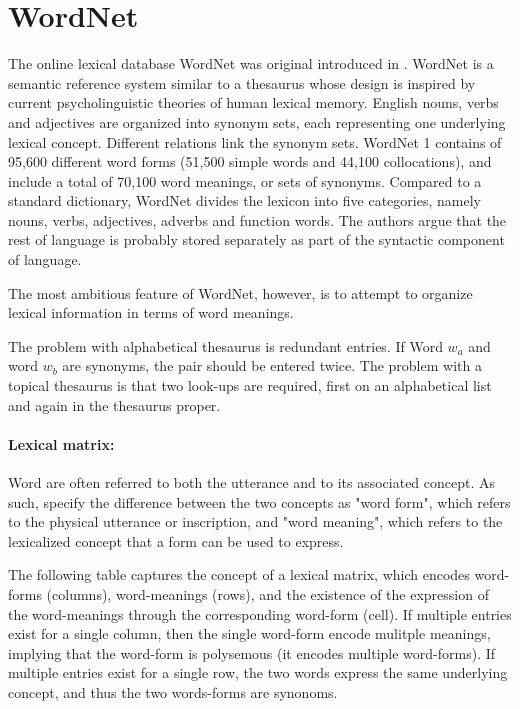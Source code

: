\documentclass[a4paper,12pt,twoside,openright]{report}
\begin{document}
\section{WordNet}

The online lexical database WordNet was original introduced in \cite{miller90}.
WordNet is a semantic reference system similar to a thesaurus whose design is inspired by current psycholinguistic theories of human lexical memory.
English nouns, verbs and adjectives are organized into synonym sets, each representing one underlying lexical concept.
Different relations link the synonym sets.
WordNet 1 contains of 95,600 different word forms (51,500 simple words and 44,100 collocations), and include a total of 70,100 word meanings, or sets of synonyms.
Compared to a standard dictionary, WordNet divides the lexicon into five categories, namely nouns, verbs, adjectives, adverbs and function words. 
The authors argue that the rest of language is probably stored separately as part of the syntactic component of language.

The most ambitious feature of WordNet, however, is to attempt to organize lexical information in terms of word meanings.

The problem with alphabetical thesaurus is redundant entries. If Word $w_a$ and word $w_b$ are synonyms, the pair should be entered twice.
The problem with a topical thesaurus is that two look-ups are required, first on an alphabetical list and again in the thesaurus proper.

\paragraph{Lexical matrix:} 
Word are often referred to both the utterance and to its associated concept.
As such, \cite{miller90} specify the difference between the two concepts as "word form", which refers to the physical utterance or inscription, and "word meaning", which refers to the lexicalized concept that a form can be used to express.

The following table captures the concept of a lexical matrix, which encodes word-forms (columns), word-meanings (rows), and the existence of the expression of the word-meanings through the corresponding word-form (cell).
If multiple entries exist for a single column, then the single word-form encode mulitple meanings, implying that the word-form is polysemous (it encodes multiple word-forms).
If multiple entries exist for a single row, the two words express the same underlying concept, and thus the two words-forms are synonoms.
\end{document}
